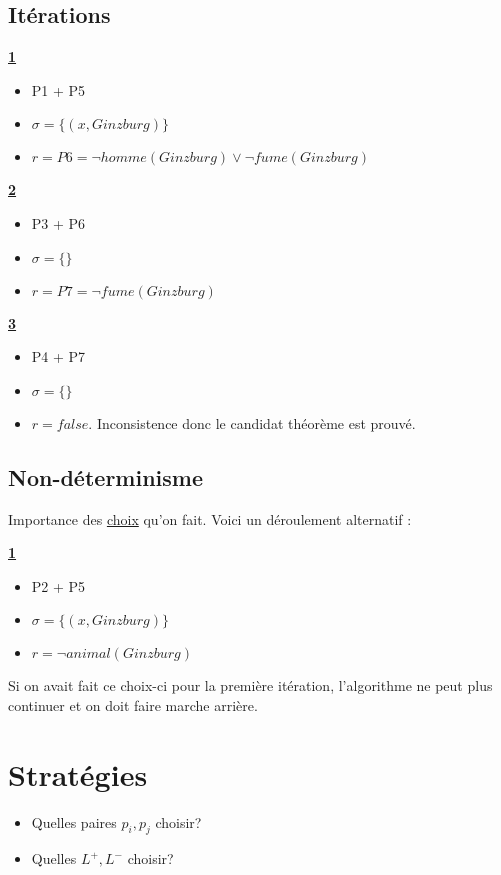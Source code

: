 \subsection{Itérations}

\textbf{\underline{1}}
\begin{itemize}
  \item P1 + P5
  \item $\sigma = \big\{ (x, Ginzburg) \big\}$
  \item $r = P6 = \neg homme(Ginzburg) \vee \neg fume(Ginzburg)$
\end{itemize}

\textbf{\underline{2}}
\begin{itemize}
  \item P3 + P6
  \item $\sigma = \big\{ \big\}$
  \item $r = P7 = \neg fume(Ginzburg)$
\end{itemize}

\textbf{\underline{3}}
\begin{itemize}
  \item P4 + P7
  \item $\sigma = \big\{ \big\}$
  \item $r = false.$ Inconsistence donc le candidat théorème est prouvé.
\end{itemize}

\subsection{Non-déterminisme}

Importance des \underline{choix} qu'on fait. Voici un déroulement alternatif :

\textbf{\underline{1}}
\begin{itemize}
  \item P2 + P5
  \item $\sigma = \big\{ (x, Ginzburg) \big\}$
  \item $r = \neg animal(Ginzburg)$
\end{itemize}

Si on avait fait ce choix-ci pour la première itération, l'algorithme ne peut plus continuer et on doit faire marche arrière.

\section{Stratégies}

\begin{itemize}
  \item Quelles paires $p_i, p_j$ choisir?
  \item Quelles $L^{+}, L^{-}$ choisir?
\end{itemize}

